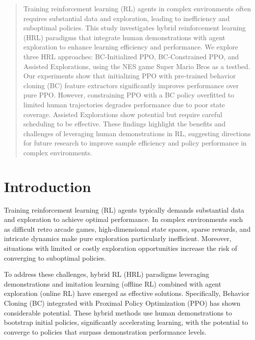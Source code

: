 \documentclass{article}
\begin{document}
\begin{abstract}
      Training reinforcement learning (RL) agents in complex environments 
      often requires substantial data and exploration, leading to inefficiency 
      and suboptimal policies. This study investigates hybrid reinforcement 
      learning (HRL) paradigms that integrate human demonstrations with agent 
      exploration to enhance learning efficiency and performance. We explore 
      three HRL approaches: BC-Initialized PPO, BC-Constrained PPO, and Assisted 
      Explorations, using the NES game Super Mario Bros as a testbed. Our 
      experiments show that initializing PPO with pre-trained behavior cloning 
      (BC) feature extractors significantly improves performance over pure PPO. 
      However, constraining PPO with a BC policy overfitted to limited human 
      trajectories degrades performance due to poor state coverage. Assisted 
      Explorations show potential but require careful scheduling to be effective. 
      These findings highlight the benefits and challenges of leveraging human 
      demonstrations in RL, suggesting directions for future research to improve 
      sample efficiency and policy performance in complex environments.
\end{abstract}

\section{Introduction}


Training reinforcement learning (RL) agents typically demands substantial 
data and exploration to achieve optimal performance. In complex environments 
such as difficult retro arcade games, high-dimensional state spaces, sparse rewards, 
and intricate dynamics make pure exploration particularly inefficient. 
Moreover, situations with limited or costly exploration opportunities 
increase the risk of converging to suboptimal policies.

To address these challenges, hybrid RL (HRL) paradigms leveraging demonstrations 
and imitation learning (offline RL) combined with agent exploration (online 
RL) have emerged as effective solutions. Specifically, Behavior Cloning (BC) 
integrated with Proximal Policy Optimization (PPO) has shown considerable 
potential. These hybrid methods use human demonstrations to bootstrap initial 
policies, significantly accelerating learning, with the potential to converge 
to policies that surpass demonstration performance levels.
\end{document}
